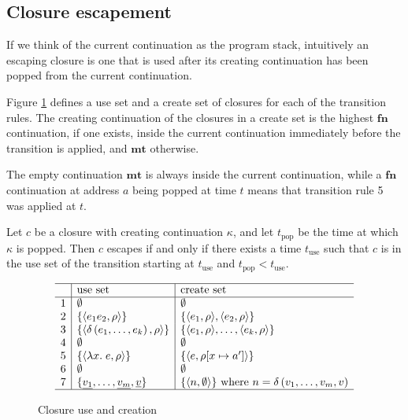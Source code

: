 \RequirePackage[hyphens]{url}\documentclass[12pt,oneside]{amsart}
\newcommand{\kw}[1]{\mathbf{#1}}
\newcommand{\lmd}[2]{\lambda #1.\;#2}
\begin{document}
\subsection{Closure escapement}

If we think of the current continuation as the program stack, intuitively an escaping closure is one that is used after its creating continuation has been popped from the current continuation.

Figure \ref{fig:creation} defines a use set and a create set of closures for each of the transition rules.  The creating continuation of the closures in a create set is the highest $\kw{fn}$ continuation, if one exists, inside the current continuation immediately before the transition is applied, and $\kw{mt}$ otherwise.

The empty continuation $\kw{mt}$ is always inside the current continuation, while a $\kw{fn}$ continuation at address $a$ being popped at time $t$ means that transition rule 5 was applied at $t$.

Let $c$ be a closure with creating continuation $\kappa$, and let $t_\text{pop}$ be the time at which $\kappa$ is popped.  Then $c$ escapes if and only if there exists a time $t_\text{use}$ such that $c$ is in the use set of the transition starting at $t_\text{use}$ and $t_\text{pop} < t_\text{use}$.

\begin{figure}[hbpt]
\[\begin{array}{c|l|l}\hline
  & \text{use set} & \text{create set} \\ \hline
1 & \emptyset & \emptyset \\
2 & \{\langle e_1e_2, \rho\rangle\} &
    \{\langle e_1, \rho\rangle, \langle e_2, \rho\rangle\} \\
3 & \{\langle \delta\left(e_1, \ldots, e_k\right), \rho\rangle\} &
    \{\langle e_1, \rho\rangle, \ldots, \langle e_k, \rho\rangle\} \\
4 & \emptyset & \emptyset \\
5 & \{\langle\lmd{x}{e}, \rho\rangle\} &
    \{\langle e, \rho[x\mapsto a^\prime]\rangle\} \\
6 & \emptyset & \emptyset \\
7 & \{\underline{v_1}, \ldots, \underline{v_m}, \underline{v}\} &
    \{\langle n, \emptyset\rangle\} \text{ where $n = \delta\left(v_1, \ldots, v_m, v\right)$} \\ \hline
\end{array}\]
\caption{Closure use and creation}
\label{fig:creation}
\end{figure}
\end{document}
